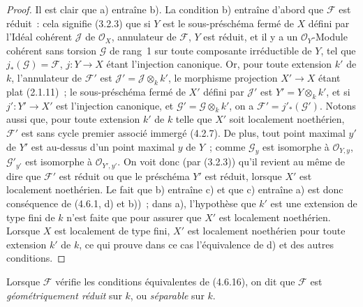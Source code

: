 \begin{proof}
Il est clair que a) entraîne b). La condition b) entraîne d'abord que
$\mathscr F$ est réduit~: cela signifie (3.2.3) que si $Y$ est le
sous-préschéma fermé de $X$ défini par l'Idéal cohérent $\mathscr J$ de
$\mathcal O_X$, annulateur de $\mathscr F$, $Y$ est réduit, et il y a un
$\mathcal O_Y$-Module cohérent sans torsion $\mathscr G$ de rang~1 sur toute
composante irréductible de $Y$, tel que $j_*(\mathscr G)=\mathscr F$,
$j:Y\to X$ étant l'injection canonique. Or, pour toute extension $k'$ de $k$,
l'annulateur de $\mathscr F'$ est $\mathscr J'=\mathscr J\otimes_k k'$, le
morphisme projection $X'\to X$ étant plat (2.1.11)~; le sous-préschéma fermé de
$X'$ défini par $\mathscr J'$ est $Y'=Y\otimes_k k'$, et si
$j':Y'\to X'$ est l'injection canonique, et
$\mathscr G'=\mathscr G\otimes_k k'$, on a $\mathscr F'=j'_*(\mathscr G')$.
Notons aussi que, pour toute extension $k'$ de $k$ telle que $X'$ soit
localement noethérien, $\mathscr F'$ est sans cycle premier associé immergé
(4.2.7). De plus, tout point maximal $y'$ de $Y'$ est au-dessus d'un point
maximal $y$ de $Y$~; comme $\mathscr G_y$ est isomorphe à
$\mathcal O_{Y,y}$, $\mathscr G'_{y'}$ est isomorphe à
$\mathcal O_{Y',y'}$. On voit donc (par (3.2.3)) qu'il revient au même de dire
que $\mathscr F'$ est réduit ou que le préschéma $Y'$ est réduit, lorsque $X'$
est localement noethérien. Le fait que b) entraîne c) et que c) entraîne
a) est donc conséquence de (4.6.1, d) et b))~; dans a), l'hypothèse que
$k'$ est une extension de type fini de $k$ n'est faite que pour assurer que
$X'$ est localement noethérien. Lorsque $X$ est localement de type fini, $X'$
est localement noethérien pour toute extension $k'$ de $k$, ce qui prouve dans
ce cas l'équivalence de d) et des autres conditions.
\end{proof}

\begin{definition}[4.6.17]
\label{IV.2.4.6.17-fr}
Lorsque $\mathscr F$ vérifie les conditions équivalentes de (4.6.16), on dit
que $\mathscr F$ est \emph{géométriquement réduit} sur $k$, ou \emph{séparable}
sur $k$.
\end{definition}

